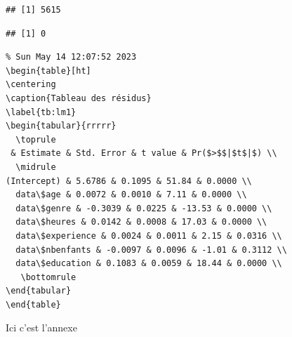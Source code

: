\documentclass[a4paper, french, 11 pt]{article}\usepackage[]{graphicx}\usepackage[]{xcolor}
\makeatletter
\newenvironment{kframe}{%
 \def\at@end@of@kframe{}%
 \ifinner\ifhmode%
  \def\at@end@of@kframe{\end{minipage}}%
  \begin{minipage}{\columnwidth}%
 \fi\fi%
 \def\FrameCommand##1{\hskip\@totalleftmargin \hskip-\fboxsep
 \colorbox{shadecolor}{##1}\hskip-\fboxsep
     \hskip-\linewidth \hskip-\@totalleftmargin \hskip\columnwidth}%
 \MakeFramed {\advance\hsize-\width
   \@totalleftmargin\z@ \linewidth\hsize
   \@setminipage}}%
 {\par\unskip\endMakeFramed%
 \at@end@of@kframe}
\newenvironment{knitrout}{}{} %
\makeatother
\begin{document}
\begin{knitrout}
\color{fgcolor}\begin{kframe}
\begin{lstlisting}[basicstyle=\ttfamily,breaklines=true]
## [1] 5615
\end{lstlisting}
\begin{lstlisting}[basicstyle=\ttfamily,breaklines=true]
## [1] 0
\end{lstlisting}
\end{kframe}
\end{knitrout}


\begin{kframe}
\begin{lstlisting}[basicstyle=\ttfamily,breaklines=true]
% latex table generated in R 4.2.1 by xtable 1.8-4 package
% Sun May 14 12:07:52 2023
\begin{table}[ht]
\centering
\caption{Tableau des résidus} 
\label{tb:lm1}
\begin{tabular}{rrrrr}
  \toprule
 & Estimate & Std. Error & t value & Pr($>$$|$t$|$) \\ 
  \midrule
(Intercept) & 5.6786 & 0.1095 & 51.84 & 0.0000 \\ 
  data\$age & 0.0072 & 0.0010 & 7.11 & 0.0000 \\ 
  data\$genre & -0.3039 & 0.0225 & -13.53 & 0.0000 \\ 
  data\$heures & 0.0142 & 0.0008 & 17.03 & 0.0000 \\ 
  data\$experience & 0.0024 & 0.0011 & 2.15 & 0.0316 \\ 
  data\$nbenfants & -0.0097 & 0.0096 & -1.01 & 0.3112 \\ 
  data\$education & 0.1083 & 0.0059 & 18.44 & 0.0000 \\ 
   \bottomrule
\end{tabular}
\end{table}
\end{lstlisting}
\end{kframe}

Ici c'est l'annexe 
\end{document}
